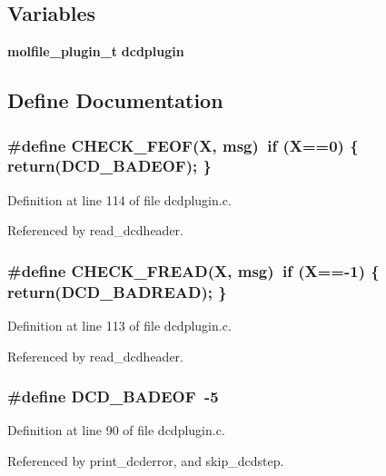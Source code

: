 \subsection*{Variables}
\begin{CompactItemize}
\item 
{\bf molfile\_\-plugin\_\-t} {\bf dcdplugin}
\end{CompactItemize}


\subsection{Define Documentation}
\subsubsection{\setlength{\rightskip}{0pt plus 5cm}\#define CHECK\_\-FEOF(X, msg)\ if (X==0)  \{ return(DCD\_\-BADEOF); \}}\label{dcdplugin_8c_a23}




Definition at line 114 of file dcdplugin.c.

Referenced by read\_\-dcdheader.
\subsubsection{\setlength{\rightskip}{0pt plus 5cm}\#define CHECK\_\-FREAD(X, msg)\ if (X==-1) \{ return(DCD\_\-BADREAD); \}}\label{dcdplugin_8c_a22}




Definition at line 113 of file dcdplugin.c.

Referenced by read\_\-dcdheader.
\subsubsection{\setlength{\rightskip}{0pt plus 5cm}\#define DCD\_\-BADEOF\ -5}\label{dcdplugin_8c_a9}




Definition at line 90 of file dcdplugin.c.

Referenced by print\_\-dcderror, and skip\_\-dcdstep.
